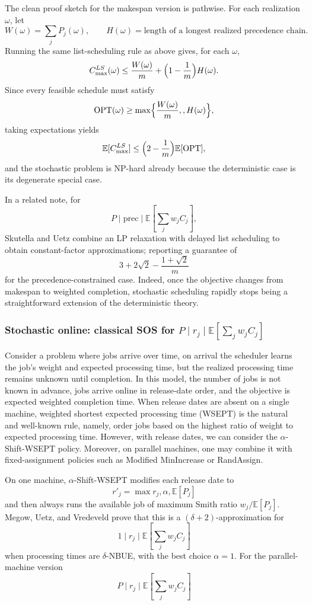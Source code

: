 The clean proof sketch for the makespan version is pathwise. For each realization \(\omega\), let
\[
W(\omega)=\sum_j P_j(\omega),\qquad
H(\omega)=\text{length of a longest realized precedence chain}.
\]
Running the same list-scheduling rule as above gives, for each \(\omega\),
\[
C_{\max}^{LS}(\omega)\le \frac{W(\omega)}{m}+\Bigl(1-\frac1m\Bigr)H(\omega).
\]
Since every feasible schedule must satisfy
\[
\mathrm{OPT}(\omega)\ge \max\Bigl\{\frac{W(\omega)}{m},,H(\omega)\Bigr\},
\]
taking expectations yields
\[
\mathbb E[C_{\max}^{LS}]
\le \Bigl(2-\frac1m\Bigr)\mathbb E[\mathrm{OPT}],
\]
and the stochastic problem is NP-hard already because the deterministic case is its degenerate special case.

In a related note, for
\[
P\mid \mathrm{prec}\mid \mathbb E\left[\sum_j w_j C_j\right],
\]
Skutella and Uetz combine an LP relaxation with delayed list scheduling to obtain constant-factor approximations; reporting a guarantee of
\[
3+2\sqrt2-\frac{1+\sqrt2}{m}
\]
for the precedence-constrained case. Indeed, once the objective changes from makespan to weighted completion, stochastic scheduling rapidly stops being a straightforward extension of the deterministic theory.

\subsubsection{Stochastic online: classical SOS for \(P\mid r_j\mid \mathbb E[\sum_j w_j C_j]\)}

Consider a problem where jobs arrive over time, on arrival the scheduler learns the job’s weight and expected processing time, but the realized processing time remains unknown until completion. In this model, the number of jobs is not known in advance, jobs arrive online in release-date order, and the objective is expected weighted completion time. When release dates are absent on a single machine, weighted shortest expected processing time (WSEPT) is the natural and well-known rule, namely, order jobs based on the highest ratio of weight to expected processing time. However, with release dates, we can consider the \(\alpha\)-Shift-WSEPT policy. Moreover, on parallel machines, one may combine it with fixed-assignment policies such as Modified MinIncrease or RandAssign.

On one machine, \(\alpha\)-Shift-WSEPT modifies each release date to
\[
r'_j=\max{r_j,\alpha,\mathbb E[P_j]}
\]
and then always runs the available job of maximum Smith ratio \(w_j/\mathbb E[P_j]\). Megow, Uetz, and Vredeveld prove that this is a \((\delta+2)\)-approximation for
\[
1\mid r_j\mid \mathbb E\left[\sum_j w_j C_j\right]
\]
when processing times are \(\delta\)-NBUE, with the best choice \(\alpha=1\). For the parallel-machine version
\[
P\mid r_j\mid \mathbb E\left[\sum_j w_j C_j\right]
\]

